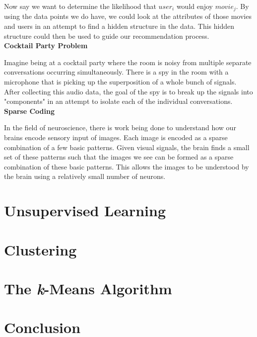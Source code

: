 \documentclass[english,course]{Notes}
\begin{document}
Now say we want to determine the likelihood that $user_i$ would enjoy $movie_j$. By using the data points we do have, we could look at the attributes of those movies and users in an attempt to find a hidden structure in the data. This hidden structure could then be used to guide our recommendation process. \\

\textbf{Cocktail Party Problem}

Imagine being at a cocktail party where the room is noisy from multiple separate conversations occurring simultaneously. There is a spy in the room with a microphone that is picking up the superposition of a whole bunch of signals. After collecting this audio data, the goal of the spy is to break up the signals into "components" in an attempt to isolate each of the individual conversations. \\

\textbf{Sparse Coding}

In the field of neuroscience, there is work being done to understand how our brains encode sensory input of images. Each image is encoded as a sparse combination of a few basic patterns. Given visual signals, the brain finds a small set of these patterns such that the images we see can be formed as a sparse combination of these basic patterns. This allows the images to be understood by the brain using a relatively small number of neurons.

\section{Unsupervised Learning}



\section{Clustering}

\section{The \textit{k}-Means Algorithm}

\section{Conclusion}
\end{document}
